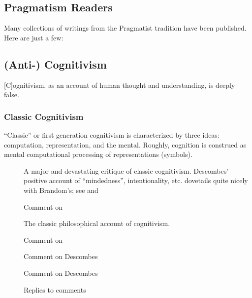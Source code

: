 \documentclass[11pt,twoside]{article}
\begin{document}
\begin{appendices}
\subsection{Pragmatism Readers}

Many collections of writings from the Pragmatist tradition have been
published.  Here are just a few:

\begin{description}
\item [\cite{menand_pragmatism_1997}]
\item [\cite{haack_pragmatism_2006}]
\item [\cite{misak_new_2007}]
\item [\cite{talisse_pragmatism_2011}]
\end{description}

\subsection{(Anti-) Cognitivism}

\epigraph{[C]ognitivism, as an account of human thought and understanding, is deeply false.}{\cite{haugeland_closing_2004}}

\subsubsection{Classic Cognitivism}

``Classic'' or first generation cognitivism is characterized by three
ideas: computation, representation, and the mental.  Roughly,
cognition is construed as mental computational processing of
representations (symbols).

\begin{description}
\item [\cite{descombes_minds_2001}] A major and devastating critique
  of classic cognitivism.  Descombes' positive account of
  ``mindedness'', intentionality, etc. dovetails quite nicely with
  Brandom's; see \cite{brandom_descombes_2004} and
  \cite{descombes_replies_2004}
\item [\cite{brandom_cog_2009}]
\item [\cite{brandom_descombes_2004}]  Comment on \cite{descombes_minds_2001}
\item [\cite{fodor_language_1979}]  The classic philosophical account of cognitivism.
\item [\cite{fodor_lot_2010}]
\item [\cite{haugeland_closing_2004}]  Comment on \cite{descombes_minds_2001}
\item [\cite{rorty_brain_2004}]  Comment on Descombes
\item [\cite{taylor_descombes_2004}]  Comment on Descombes
\item [\cite{descombes_replies_2004}]  Replies to comments
\item [\cite{kitzinger_after_2006}]
\end{description}


\end{appendices}
\end{document}
